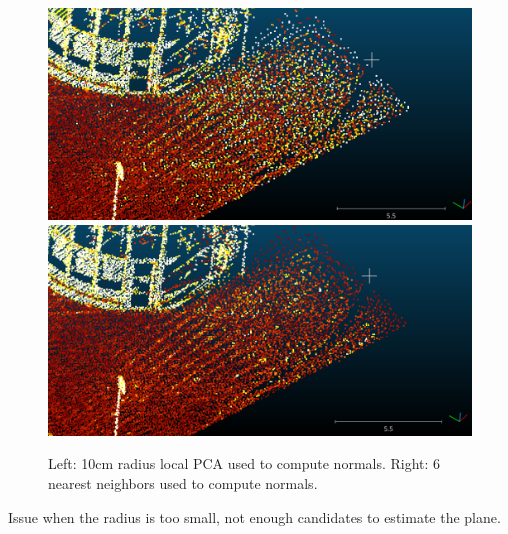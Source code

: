 \documentclass[a4paper]{article}
\begin{document}
\begin{figure}[ht]
  \centering
  \includegraphics[width=0.46\linewidth]{figures/zoom_r=0_1.png}
  \includegraphics[width=0.46\linewidth]{figures/zoom_k=6.png}
  \caption{Left: 10cm radius local PCA used to compute normals. 
  Right: 6 nearest neighbors used to compute normals.} 
  \label{fig:local_PCA_neighbor_zoom}
\end{figure}
Issue when the radius is too small, not enough candidates to estimate the plane.
\end{document}
